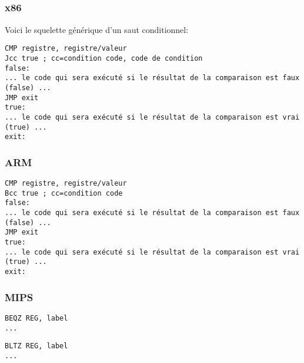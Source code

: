 \label{sec:Jcc}






\subsection{\Conclusion{}}

\subsubsection{x86}

Voici le squelette générique d'un saut conditionnel:

\begin{lstlisting}[caption=x86,style=customasmx86]
CMP registre, registre/valeur
Jcc true ; cc=condition code, code de condition
false:
... le code qui sera exécuté si le résultat de la comparaison est faux (false) ...
JMP exit 
true:
... le code qui sera exécuté si le résultat de la comparaison est vrai (true) ...
exit:
\end{lstlisting}

\subsubsection{ARM}

\begin{lstlisting}[caption=ARM,style=customasmARM]
CMP registre, registre/valeur
Bcc true ; cc=condition code
false:
... le code qui sera exécuté si le résultat de la comparaison est faux (false) ...
JMP exit 
true:
... le code qui sera exécuté si le résultat de la comparaison est vrai (true) ...
exit:
\end{lstlisting}

\subsubsection{MIPS}

\begin{lstlisting}[caption=Check si zéro (Branch if EQual Zero),style=customasmMIPS]
BEQZ REG, label
...
\end{lstlisting}

\begin{lstlisting}[caption=Check si plus petit que zéro (Branch if Less Than Zero) en utilisant une pseudo instruction,style=customasmMIPS]
BLTZ REG, label
...
\end{lstlisting}

